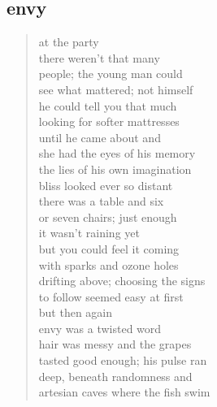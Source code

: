 \documentclass[11pt]{article}
\begin{document}
\subsection{envy}
\label{sec:org8893a8e}
\begin{verse}
at the party\\
there weren't that many\\
people; the young man could\\
see what mattered; not himself\\
he could tell you that much\\
looking for softer mattresses\\
until he came about and\\
she had the eyes of his memory\\
the lies of his own imagination\\
bliss looked ever so distant\\
\vspace*{1em}
there was a table and six\\
or seven chairs; just enough\\
it wasn't raining yet\\
but you could feel it coming\\
with sparks and ozone holes\\
drifting above; choosing the signs\\
to follow seemed easy at first\\
\vspace*{1em}
but then again\\
envy was a twisted word\\
hair was messy and the grapes\\
tasted good enough; his pulse ran\\
deep, beneath randomness and\\
artesian caves where the fish swim\\
\end{verse}
\end{document}
